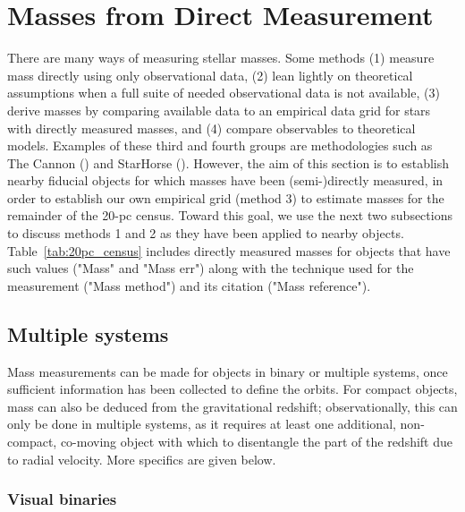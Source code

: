 \documentclass[twocolumn,tighten,twocolappendix]{aastex631}
\begin{document}
\section{Masses from Direct Measurement\label{sec:mass_methods}}

There are many ways of measuring stellar masses. Some methods (1) measure mass directly using only observational data, (2) lean lightly on theoretical assumptions when a full suite of needed observational data is not available, (3) derive masses by comparing available data to an empirical data grid for stars with directly measured masses, and (4) compare observables to theoretical models. Examples of these third and fourth groups are methodologies such as The Cannon (\citealt{ness2016}) and StarHorse (\citealt{queiroz2018}). However, the aim of this section is to establish nearby fiducial objects for which masses have been (semi-)directly measured, in order to establish our own empirical grid (method 3) to estimate masses for the remainder of the 20-pc census. Toward this goal, we use the next two subsections to discuss methods 1 and 2 as they have been applied to nearby objects. Table~\ref{tab:20pc_census} includes directly measured masses for objects that have such values ("Mass" and "Mass err") along with the technique used for the measurement ("Mass method") and its citation ("Mass reference").

\subsection{Multiple systems} 

Mass measurements can be made for objects in binary or multiple systems, once sufficient information has been collected to define the orbits. For compact objects, mass can also be deduced from the gravitational redshift; observationally, this can only be done in multiple systems, as it requires at least one additional, non-compact, co-moving object with which to disentangle the part of the redshift due to radial velocity. More specifics are given below.

\subsubsection{Visual binaries}
\end{document}
